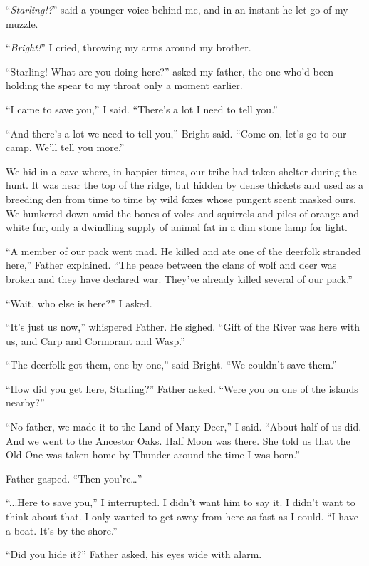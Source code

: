 ``\emph{Starling!?}'' said a younger voice behind me, and in an instant he let go of my muzzle.

``\emph{Bright!}'' I cried, throwing my arms around my brother.

``Starling! What are you doing here?'' asked my father, the one who'd been holding the spear to my throat only a moment earlier.

``I came to save you,'' I said. ``There's a lot I need to tell you.''

``And there's a lot we need to tell you,'' Bright said. ``Come on, let's go to our camp. We'll tell you more.''

\secdiv

\noindent We hid in a cave where, in happier times, our tribe had taken shelter during the hunt. It was near the top of the ridge, but hidden by dense thickets and used as a breeding den from time to time by wild foxes whose pungent scent masked ours. We hunkered down amid the bones of voles and squirrels and piles of orange and white fur, only a dwindling supply of animal fat in a dim stone lamp for light.

``A member of our pack went mad. He killed and ate one of the deerfolk stranded here,'' Father explained. ``The peace between the clans of wolf and deer was broken and they have declared war. They've already killed several of our pack.''

``Wait, who else is here?'' I asked.

``It's just us now,'' whispered Father. He sighed. ``Gift of the River was here with us, and Carp and Cormorant and Wasp.''

``The deerfolk got them, one by one,'' said Bright. ``We couldn't save them.''

``How did you get here, Starling?'' Father asked. ``Were you on one of the islands nearby?''

``No father, we made it to the Land of Many Deer,'' I said. ``About half of us did. And we went to the Ancestor Oaks. Half Moon was there. She told us that the Old One was taken home by Thunder around the time I was born.''

Father gasped. ``Then you're\ldots''

``...Here to save you,'' I interrupted. I didn't want him to say it. I didn't want to think about that. I only wanted to get away from here as fast as I could. ``I have a boat. It's by the shore.''

``Did you hide it?'' Father asked, his eyes wide with alarm.

